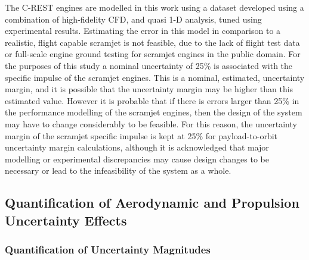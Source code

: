 

The C-REST engines are modelled in this work using a dataset developed using a combination of high-fidelity CFD, and quasi 1-D analysis, tuned using experimental results. Estimating the error in this model in comparison to a realistic, flight capable scramjet is not feasible, due to the lack of flight test data or full-scale engine ground testing for scramjet engines in the public domain. For the purposes of this study a nominal uncertainty of 25\% is associated with the specific impulse of the scramjet engines. This is a nominal, estimated, uncertainty margin, and it is possible that the uncertainty margin may be higher than this estimated value. However it is probable that if there is errors larger than 25\% in the performance modelling of the scramjet engines, then the design of the system may have to change considerably to be feasible. For this reason, the uncertainty margin of the scramjet specific impulse is kept at 25\% for payload-to-orbit uncertainty margin calculations, although it is acknowledged that major modelling or experimental discrepancies may cause design changes to be necessary or lead to the infeasibility of the system as a whole. 


\subsection{Quantification of Aerodynamic and Propulsion Uncertainty Effects}


\subsubsection{Quantification of Uncertainty Magnitudes}

